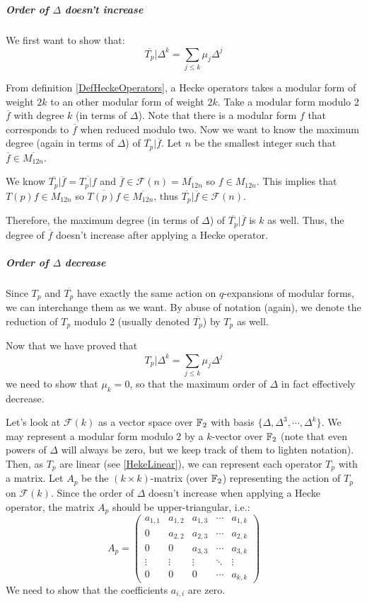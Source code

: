 \subparagraph{Order of $\Delta$ doesn't increase}
We first want to show that:
$$
\overline{T_p}| \Delta^k = \sum_{j \leq k} \mu_j \Delta^j
$$

From definition \ref{DefHeckeOperators}, a Hecke operators takes a modular form of weight $2k$ to an other modular form of weight $2k$.
Take a modular form modulo 2 $\overline{f}$ with degree $k$ (in terms of $\Delta$).
Note that there is a modular form $f$ that corresponds to $\overline{f}$ when reduced modulo two.
Now we want to know the maximum degree (again in terms of $\Delta$) of $\overline{T_p}|\overline{f}$.
Let $n$ be the smallest integer such that $\overline{f} \in \overline{M_{12n}}$.

We know $\overline{T_p}|\overline{f} = \overline{T_p|f}$ and $\overline{f} \in \mathcal{F}(n) = \overline{M_{12n}}$ so $f \in M_{12n}$.
This implies that $T(p)f \in M_{12n}$ so $\overline{T(p)f} \in \overline{M_{12n}}$, thus $\overline{T_p}|\overline{f} \in \mathcal{F}(n)$.

Therefore, the maximum degree (in terms of $\Delta$) of $\overline{T_p}|\overline{f}$ is $k$ as well.
Thus, the degree of $\overline{f}$ doesn't increase after applying a Hecke operator.

\subparagraph{Order of $\Delta$ decrease}
\label{orderDecrease}
Since $T_p$ and $\overline{T_p}$ have exactly the same action on $q$-expansions of modular forms, we can interchange them as we want.
By abuse of notation (again), we denote the reduction of $T_p$ modulo 2 (usually denoted $\overline{T_p}$) by $T_p$ as well.

Now that we have proved that 
$$
T_p| \Delta^k = \sum_{j \leq k} \mu_j \Delta^j
$$
we need to show that $\mu_k = 0$, so that the maximum order of $\Delta$ in fact effectively decrease.

Let's look at $\mathcal{F}(k)$ as a vector space over $\mathbb{F}_2$ with basis $\{ \Delta, \Delta^3, \cdots, \Delta^k \}$.
We may represent a modular form modulo 2 by a $k$-vector over $\mathbb{F}_2$ (note that even powers of $\Delta$ will always be zero, but we keep track of them to lighten notation).
Then, as $T_p$ are linear (see \ref{HekeLinear}), we can represent each operator $T_p$ with a matrix.
Let $A_p$ be the $(k \times k)$-matrix (over $\mathbb{F}_2$) representing the action of $T_p$ on $\mathcal{F}(k)$.
Since the order of $\Delta$ doesn't increase when applying a Hecke operator, the matrix $A_p$ should be upper-triangular, i.e.:
$$
A_p = 
\begin{pmatrix}
a_{1,1} & a_{1,2} & a_{1,3} & \cdots & a_{1,k} \\
   0    & a_{2,2} & a_{2,3} & \cdots & a_{2,k} \\
   0    &    0    & a_{3,3} & \cdots & a_{3,k} \\
\vdots  & \vdots  & \vdots  & \ddots & \vdots  \\
   0    &    0    &    0    & \cdots & a_{k,k}
\end{pmatrix}
$$
We need to show that the coefficients $a_{i,i}$ are zero.

